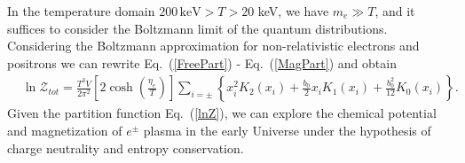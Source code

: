 In the temperature domain $ 200\,\mathrm{keV} > T > 20$ keV, we have $m_e\gg T$, and it suffices to consider the Boltzmann limit of the quantum distributions. Considering the Boltzmann approximation for non-relativistic electrons and positrons we can rewrite Eq.~(\ref{FreePart}) - Eq.~(\ref{MagPart}) and obtain
\begin{align}
 \label{lnZ}
&\ln\mathcal{Z}_{tot}\!=\!\frac{T^3V}{2\pi^2}\left[2\cosh\left(\frac{\eta_{e}}{T}\right)\right]\sum_{i=\pm}\left\{x_i^{2} K_2\left(x_i\right)+\frac{b_0}{2}x_iK_1\left(x_i\right)+\frac{b^2_0}{12}K_0\left(x_i\right)\right\}.
\end{align}
Given the partition function Eq.~(\ref{lnZ}), we can explore the chemical potential and magnetization of $e^\pm$ plasma in the early Universe
under the hypothesis of charge neutrality and entropy conservation.

